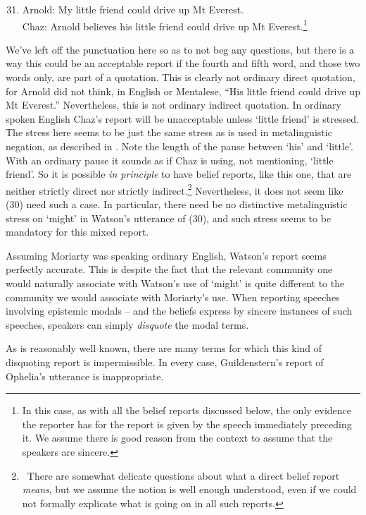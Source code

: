 \begin{enumerate}
\setcounter{enumi}{30} 
\item Arnold: My little friend could drive up Mt Everest. \\
 Chaz: Arnold believes his little friend could drive up Mt Everest.\footnote{In this case, as with all the belief reports discussed below, the only evidence the reporter has for the report is given by the speech immediately preceding it. We assume there is good reason from the context to assume that the speakers are sincere.}
\end{enumerate}

\noindent We've left off the punctuation here so as to not beg any questions, but there is a way this could be an acceptable report if the fourth and fifth word, and those two words only, are part of a quotation. This is clearly not ordinary direct quotation, for Arnold did not think, in English or Mentalese, ``His little friend could drive up Mt Everest.'' Nevertheless, this is not ordinary indirect quotation. In ordinary spoken English Chaz's report will be unacceptable unless `little friend' is stressed. The stress here seems to be just the same stress as is used in metalinguistic negation, as described in \citet{Horn1989}. Note the length of the pause between `his' and `little'. With an ordinary pause it sounds as if Chaz is using, not mentioning, `little friend'. So it is possible \textit{in principle} to have belief reports, like this one, that are neither strictly direct nor strictly indirect.\footnote{\ There are somewhat delicate questions about what a direct belief report \textit{means}, but we assume the notion is well enough understood, even if we could not formally explicate what is going on in all such reports.} Nevertheless, it does not seem like (30) need such a case. In particular, there need be no distinctive metalinguistic stress on `might' in Watson's utterance of (30), and such stress seems to be mandatory for this mixed report.
 
Assuming Moriarty was speaking ordinary English, Watson's report seems perfectly accurate. This is despite the fact that the relevant community one would naturally associate with Watson's use of `might' is quite different to the community we would associate with Moriarty's use. When reporting speeches involving epistemic modals -- and the beliefs express by sincere instances of such speeches, speakers can simply \textit{disquote} the modal terms.
 
As is reasonably well known, there are many terms for which this kind of disquoting report is impermissible. In every case, Guildenstern's report of Ophelia's utterance is inappropriate.
 
